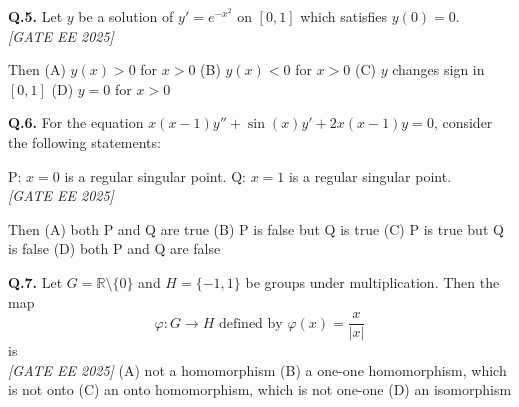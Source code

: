 \documentclass[11pt]{article}
\begin{document}
\vspace{0.5cm}

\textbf{Q.5.} Let $y$ be a solution of $y' = e^{-x^2}$ on $[0,1]$ which satisfies $y(0) = 0$.
\\[1ex] \textit{[GATE EE 2025]}

Then  \newline
(A) $y(x) > 0$ for $x > 0$  \newline
(B) $y(x) < 0$ for $x > 0$  \newline
(C) $y$ changes sign in $[0,1]$  \newline
(D) $y = 0$ for $x > 0$\newline

\vspace{0.5cm}

\textbf{Q.6.} For the equation $x(x - 1)y'' + \sin(x)y' + 2x(x - 1)y = 0$, consider the following statements:\newline

P: $x = 0$ is a regular singular point.  \newline
Q: $x = 1$ is a regular singular point.\newline
\\[1ex] \textit{[GATE EE 2025]}

Then  \newline
(A) both P and Q are true  \newline
(B) P is false but Q is true  \newline
(C) P is true but Q is false  \newline
(D) both P and Q are false\newline

\vspace{0.5cm}

\textbf{Q.7.} Let $G = \mathbb{R} \setminus \{0\}$ and $H = \{-1, 1\}$ be groups under multiplication. Then the map  \newline
\[
\varphi : G \to H \text{ defined by } \varphi(x) = \frac{x}{|x|}
\]  
is  
\\[1ex] \textit{[GATE EE 2025]}
\newline
(A) not a homomorphism  \newline
(B) a one-one homomorphism, which is not onto  \newline
(C) an onto homomorphism, which is not one-one  \newline
(D) an isomorphism\newline
\end{document}
